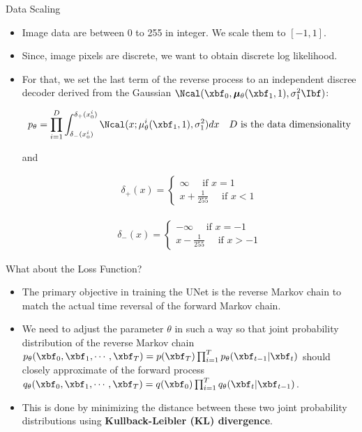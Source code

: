 \documentclass[aspectratio=169,xcolor=dvipsnames,svgnames,x11names,fleqn]{beamer}
\begin{document}
    
    \begin{frame}{Data Scaling}
    
    \footnotesize
    
    \begin{itemize}
    \item Image data are between 0 to 255 in integer. We scale them to $[-1, 1]$.
    \item Since, image pixels are discrete, we want to obtain discrete log likelihood.
    \item For that, we set the last term of the reverse process to an independent discree decoder derived from the Gaussian $\Ncal(\xbf_0, \bm\mu_\theta (\xbf_1, 1), \sigma_1^2\Ibf)$:

\begin{align*}
p_\theta = \prod_{i=1}^D \int_{\delta_{-}(x_0^i)}^{\delta_{+}(x_0^i)} \Ncal(x; \mu_\theta^i (\xbf_1, 1), \sigma_1^2) dx \quad D \text{ is the data dimensionality} 
\end{align*}  

and

\begin{align*}
\delta_+(x) = \begin{cases}
\infty \quad \text{ if } x = 1\\
x + \frac{1}{255} \quad \text { if } x < 1
\end{cases}
\end{align*}  
 
\begin{align*}
\delta_-(x) = \begin{cases}
-\infty \quad \text{ if } x = -1\\
x - \frac{1}{255} \quad \text { if } x > -1
\end{cases}
\end{align*}  
    
    \end{itemize}
    
    \end{frame}
    
    \begin{frame}{What about the Loss Function?}
        \begin{itemize}
            \item The primary objective in training the UNet is the reverse Markov chain to match the
    actual time reversal of the forward Markov chain.
    \item We need to adjust the parameter $\theta$ in such a way so that joint probability distribution of the reverse Markov chain $p_\theta(\xbf_0,\xbf_1, \cdots,\xbf_T) = p(\xbf_T)\prod_{i=1}^T p_\theta (\xbf_{t-1}|\xbf_t)$ should closely approximate of the forward process $q_\theta(\xbf_0,\xbf_1, \cdots,\xbf_T) = q(\xbf_0)\prod_{i=1}^T q_\theta (\xbf_{t}|\xbf_{t-1})$.
    \item This is done by minimizing the distance between these two joint probability distributions using \textbf{Kullback-Leibler (KL) divergence}.
        \end{itemize}
    \end{frame}
    
\end{document}
